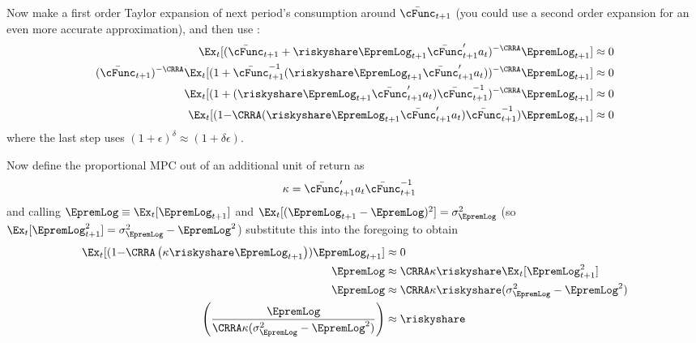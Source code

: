 \documentclass{\econtex}
\begin{document}
Now make a first order Taylor expansion of next period's consumption around $\cNxt$ (you could use a second order expansion for an even more accurate approximation), and then use :
\begin{equation}\begin{gathered}\begin{aligned}
\Ex_{t}[(\cNxt+\riskyshare\EpremLog_{t+1}\bar{\cFunc}^{\prime}_{t+1}{a}_{t}\orderTwo )^{-\CRRA}\EpremLog_{t+1}] & \approx  0
\\ (\cNxt)^{-\CRRA}
\Ex_{t}[
(1+
\cNxt^{-1}(\riskyshare\EpremLog_{t+1}\bar{\cFunc}^{\prime}_{t+1}{a}_{t}\orderTwo)
)^{-\CRRA}\EpremLog_{t+1}
]
& \approx  0
\\ \Ex_{t}[(1+(\riskyshare\EpremLog_{t+1}\bar{\cFunc}^{\prime}_{t+1}{a}_{t}\orderTwo)\cNxt^{-1})^{-\CRRA}\EpremLog_{t+1}]& \approx  0
\\ 
\Ex_{t}[
(1{-\CRRA}
(\riskyshare\EpremLog_{t+1}\bar{\cFunc}^{\prime}_{t+1}{a}_{t}\orderTwo)\cNxt^{-1}
)\EpremLog_{t+1}
]
& \approx  0
\end{aligned}\end{gathered}\end{equation}
where the last step uses $(1+\epsilon)^{\delta} \approx (1+\delta \epsilon)$.

Now define the proportional MPC out of an additional unit of return as
\begin{equation}\begin{gathered}\begin{aligned}
\kappa & = \bar{\cFunc}^{\prime}_{t+1}{a}_{t}\orderTwo\cNxt^{-1}
\end{aligned}\end{gathered}\end{equation}
and calling $\EpremLog \equiv \Ex_{t}[\EpremLog_{t+1}]$ and $\Ex_{t}[(\EpremLog_{t+1}-\EpremLog)^{2}]=\sigma^{2}_{\EpremLog}$ (so $\Ex_{t}[\EpremLog_{t+1}^{2}]=\sigma^{2}_{\EpremLog}-\EpremLog^{2}$) substitute this into the foregoing to obtain
\begin{equation}\begin{gathered}\begin{aligned}
\Ex_{t}[
(1{-\CRRA}
\left(
\kappa\riskyshare \EpremLog_{t+1}
\right)
)\EpremLog_{t+1}] & \approx 0
\\ \EpremLog & \approx      \CRRA   \kappa\riskyshare \Ex_{t}[\EpremLog_{t+1}^{2}      ]
\\ \EpremLog & \approx      \CRRA   \kappa\riskyshare (\sigma^{2}_{\EpremLog}-\EpremLog^{2})
\\      \left(\frac{\EpremLog}{\CRRA   \kappa(\sigma^{2}_{\EpremLog}-\EpremLog^{2})}\right) & \approx \riskyshare
\end{aligned}\end{gathered}\end{equation}
\clearpage 

 \econtexBibMake
\end{document}
